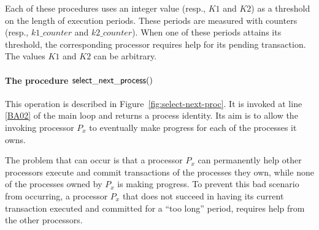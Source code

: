 Each of these  procedures  uses an  integer value (resp., $K1$ and $K2$) 
as  a threshold  on the length of execution periods. These periods 
are measured with counters (resp., $k1\_counter$ and $k2\_counter$). 
When one of these periods attains its threshold, the corresponding 
processor requires help for its pending  transaction. 
The values $K1$ and $K2$ can be arbitrary. 


\paragraph{The procedure  ${\sf select\_next\_process}()$}
This operation is described in Figure~\ref{fig:select-next-proc}.
It is invoked at line \ref{BA02} of the main loop and 
returns a process identity.  Its aim is to allow the invoking processor 
$P_x$  to  eventually make  progress for each of the processes it owns. 

The problem that can  occur is that a processor  $P_x$ 
can permanently help other processors execute and commit
transactions of the processes they own, while none of the processes 
owned by $P_x$ is  making progress.  To prevent this bad scenario  
from occurring, a  processor $P_x$ that does not  succeed in having  
its current transaction executed and committed for  a ``too long''
period,  requires help from the other processors. 






